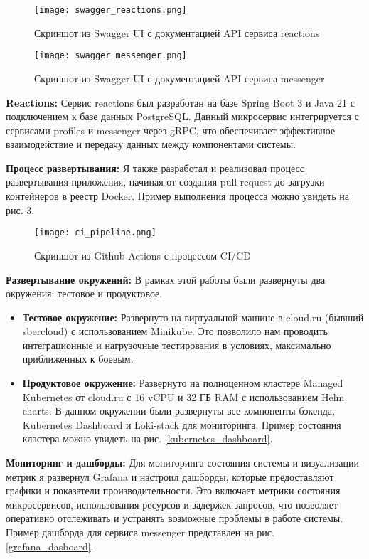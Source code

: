 \begin{figure}[h]
    \centering
    \texttt{[image: swagger\_reactions.png]}
    \caption{Скриншот из Swagger UI с документацией API сервиса reactions}
    \label{swagger_reactions}
\end{figure}

\begin{figure}[h]
    \centering
    \texttt{[image: swagger\_messenger.png]}
    \caption{Скриншот из Swagger UI с документацией API сервиса messenger}
    \label{swagger_messenger}
\end{figure}

\textbf{Reactions:} 
Сервис reactions был разработан на базе Spring Boot 3 и Java 21 с подключением к базе данных PostgreSQL. Данный микросервис интегрируется с сервисами profiles и messenger через gRPC, что обеспечивает эффективное взаимодействие и передачу данных между компонентами системы.

\textbf{Процесс развертывания:}
Я также разработал и реализовал процесс развертывания приложения, начиная от создания pull request до загрузки контейнеров в реестр Docker. Пример выполнения процесса можно увидеть на рис. \ref{ci_pipeline}. 

\begin{figure}[h]
    \centering
    \texttt{[image: ci\_pipeline.png]}
    \caption{Скриншот из Github Actions с процессом CI/CD}
    \label{ci_pipeline}
\end{figure}

\textbf{Развертывание окружений:}
В рамках этой работы были развернуты два окружения: тестовое и продуктовое.

\begin{itemize}
    \item \textbf{Тестовое окружение:} Развернуто на виртуальной машине в cloud.ru (бывший sbercloud) с использованием Minikube. Это позволило нам проводить интеграционные и нагрузочные тестирования в условиях, максимально приближенных к боевым.
    \item \textbf{Продуктовое окружение:} Развернуто на полноценном кластере Managed Kubernetes от cloud.ru с 16 vCPU и 32 ГБ RAM с использованием Helm charts. В данном окружении были развернуты все компоненты бэкенда, Kubernetes Dashboard и Loki-stack для мониторинга. Пример состояния кластера можно увидеть на рис. \ref{kubernetes_dashboard}.
\end{itemize}

\textbf{Мониторинг и дашборды:}
Для мониторинга состояния системы и визуализации метрик я развернул Grafana и настроил дашборды, которые предоставляют графики и показатели производительности. Это включает метрики состояния микросервисов, использования ресурсов и задержек запросов, что позволяет оперативно отслеживать и устранять возможные проблемы в работе системы. Пример дашборда для сервиса messenger представлен на рис. \ref{grafana_dasboard}.

